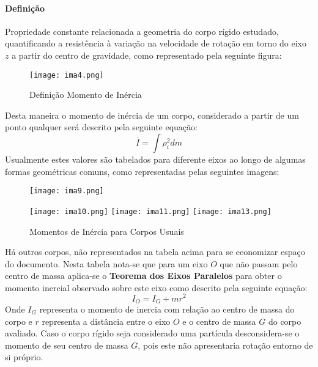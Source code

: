 \documentclass{article}
\begin{document}
            \paragraph{Definição}Propriedade constante relacionada a geometria do corpo rígido estudado, quantificando a resistência à variação na velocidade de rotação em torno do eixo $z$ a partir do centro de gravidade, como representado pela seguinte figura:
                \begin{figure}[H]
                    \centering
                    \texttt{[image: ima4.png]}
                    \caption{Definição Momento de Inércia}
                \end{figure}\noindent
            Desta maneira o momento de inércia de um corpo, considerado a partir de um ponto qualquer será descrito pela seguinte equação:
                \begin{equation}
                    \boxed{
                        \overline{I} = \int\rho^{2}_{i}dm
                    }
                \end{equation}
            Usualmente estes valores são tabelados para diferente eixos ao longo de algumas formas geométricas comuns, como representadas pelas seguintes imagens:
                \begin{figure}[H]
                    \centering
                    \texttt{[image: ima9.png]}
                \end{figure}
                \begin{figure}[H]
                    \centering
                    \texttt{[image: ima10.png]}
                    \texttt{[image: ima11.png]}
                    \texttt{[image: ima13.png]}
                    \caption{Momentos de Inércia para Corpos Usuais} \label{momentoInercia}
                \end{figure}\noindent
            Há outros corpos, não representados na tabela acima para se economizar espaço do documento. Nesta tabela nota-se que para um eixo $O$ que não passam pelo centro de massa aplica-se o \textbf{Teorema dos Eixos Paralelos} para obter o momento inercial observado sobre este eixo como descrito pela seguinte equação:
                \begin{equation}
                    \boxed{
                        I_{O} = I_{G} + m r^{2}
                    }
                \end{equation}
            Onde $I_{G}$ representa o momento de inercia com relação ao centro de massa do corpo e $r$ representa a distância entre o eixo $O$ e o centro de massa $G$ do corpo avaliado. Caso o corpo rígido seja considerado uma partícula desconsidera-se o momento de seu centro de massa $G$, pois este não apresentaria rotação entorno de si próprio.
\end{document}
